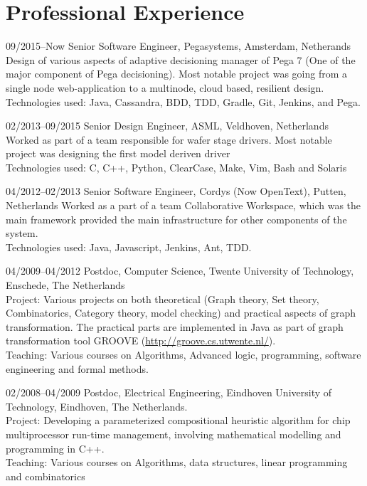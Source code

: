 \section{Professional Experience}

\begin{CV}
\item[09/2015--Now] Senior Software Engineer, Pegasystems, Amsterdam, Netherands
Design of various aspects of adaptive decisioning manager of Pega 7 (One of the major component of Pega decisioning). Most notable project was going from a single node web-application to a multinode, cloud based, resilient design. \\
Technologies used: Java, Cassandra, BDD, TDD, Gradle, Git, Jenkins, and Pega.

\item[02/2013--09/2015] Senior Design Engineer, ASML, Veldhoven, Netherlands
Worked as part of a team responsible for wafer stage drivers. Most notable project was designing the first model deriven driver \\
Technologies used: C, C++, Python, ClearCase, Make, Vim, Bash and Solaris

\item[04/2012--02/2013] Senior Software Engineer, Cordys (Now OpenText), Putten, Netherlands
Worked as a part of a team Collaborative Workspace, which was the main framework provided the main infrastructure for other components of the system. \\
Technologies used: Java, Javascript, Jenkins, Ant, TDD.

\item[04/2009--04/2012]Postdoc, Computer Science, Twente University of
Technology, Enschede, The Netherlands \\
\ifindustry
Project: Various projects on both theoretical (Graph theory, Set theory, Combinatorics, Category theory, model checking) and practical aspects of graph transformation. The practical
parts are implemented in Java as part of graph transformation tool GROOVE (\url{http://groove.cs.utwente.nl/}).  \\
Teaching: Various courses on Algorithms, Advanced logic, programming, software engineering and formal methods.
\fi

\item[02/2008--04/2009] Postdoc, Electrical Engineering, Eindhoven University
of Technology, Eindhoven, The Netherlands. \\
\ifindustry
Project: Developing a parameterized compositional heuristic algorithm for chip multiprocessor run-time management, involving mathematical modelling and programming in C++.\\
Teaching: Various courses on Algorithms, data structures, linear programming and combinatorics
\fi


\end{CV}
